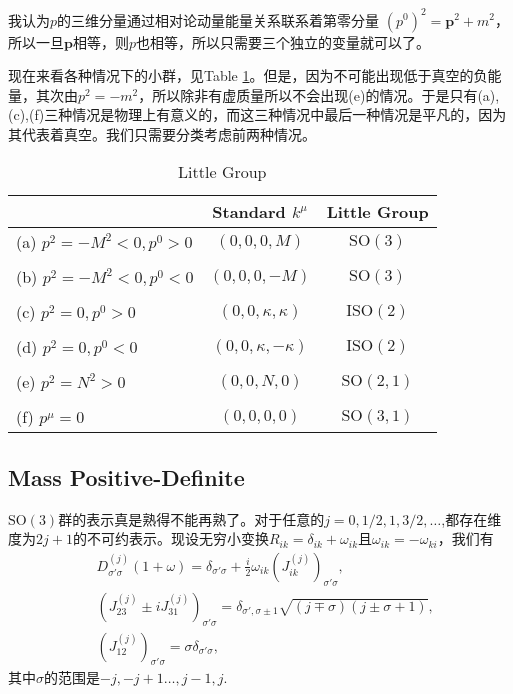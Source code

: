 \documentclass[9pt]{extbook}
\begin{document}
我认为$p$的三维分量通过相对论动量能量关系联系着第零分量
$(p^0)^2=\bm{p}^2+m^2$，所以一旦$\bm{p}$相等，则$p$也相等，所以只需要三个独立的变量就可以了。

现在来看各种情况下的小群，见Table \ref{little group}。但是，因为不可能出现低于真空的负能量，其次由$p^2=-m^2$，所以除非有虚质量所以不会出现(e)的情况。于是只有(a),(c),(f)三种情况是物理上有意义的，而这三种情况中最后一种情况是平凡的，因为其代表着真空。我们只需要分类考虑前两种情况。

\begin{table}[ht]
\centering
\begin{tabular}{l c c}
&Standard $k^\mu$ & Little Group\\
\hline
(a) $p^2=-M^2<0,p^0>0$ & $(0,0,0,M)$ & $\mathrm{SO}\left(3\right)$\\
\\
(b) $p^2=-M^2<0,p^0<0$ & $(0,0,0,-M)$ & $\mathrm{SO}\left(3\right)$\\
\\
(c) $p^2=0,p^0>0$ & $(0,0,\kappa,\kappa)$ & $\mathrm{ISO}\left(2\right)$\\
\\
(d) $p^2=0,p^0<0$ & $(0,0,\kappa,-\kappa)$ & $\mathrm{ISO}\left(2\right)$\\
\\
(e) $p^2=N^2>0$ & $(0,0,N,0)$ & $\mathrm{SO}\left(2,1\right)$\\
\\
(f) $p^\mu=0$ & $(0,0,0,0)$ & $\mathrm{SO}\left(3,1\right)$\\
\hline
\end{tabular}
\caption{Little Group}
\label{little group}
\end{table}

\subsection*{Mass Positive-Definite}
$\mathrm{SO}(3)$群的表示真是熟得不能再熟了。对于任意的$j=0,1/2,1,3/2,\dots$,都存在维度为$2j+1$的不可约表示。现设无穷小变换$R_{ik}=\delta_{ik}+\omega_{ik}$且$\omega_{ik}=-\omega_{ki}$，我们有
\[
\begin{split}
&D^{(j)}_{\sigma'\sigma}(1+\omega)=\delta_{\sigma'\sigma}+\frac{i}{2}\omega_{ik}(J^{(j)}_{ik})_{\sigma'\sigma},\\
&(J^{(j)}_{23}\pm iJ^{(j)}_{31})_{\sigma'\sigma}=\delta_{\sigma',\sigma\pm 1}\sqrt{(j\mp\sigma)(j\pm\sigma+1)},\\
&(J^{(j)}_{12})_{\sigma'\sigma}=\sigma\delta_{\sigma'\sigma},
\end{split}
\]
其中$\sigma$的范围是$-j,-j+1\dots,j-1,j$.
\end{document}
